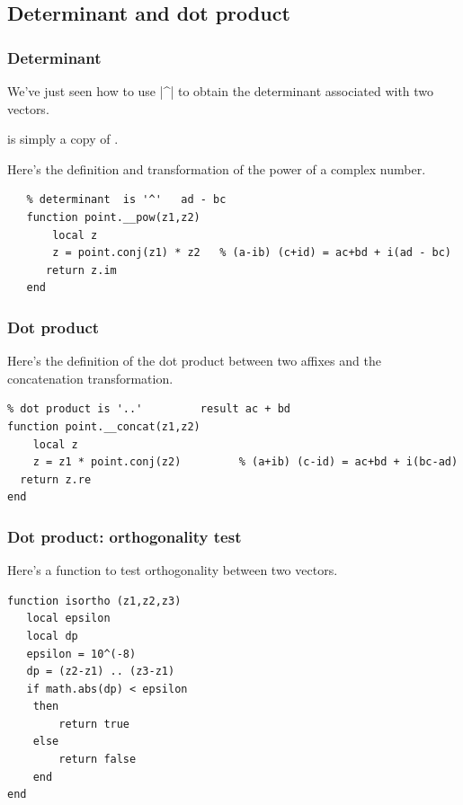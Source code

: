 \subsection{Determinant and dot product} %
\label{sub:determinant_et_produit_scalaire}

\subsubsection{Determinant} %
\label{ssub:determinant}

We've just seen how to use |^| to obtain the determinant associated with two vectors. 

  is simply a copy of   .

Here's the definition and transformation of the power of a complex number.

\begin{Verbatim}
   % determinant  is '^'   ad - bc
   function point.__pow(z1,z2)
       local z
       z = point.conj(z1) * z2   % (a-ib) (c+id) = ac+bd + i(ad - bc)
      return z.im
   end
\end{Verbatim}


\subsubsection{Dot product} %
\label{ssub:scalar_product}

Here's the definition of the dot product between two affixes and the concatenation transformation. 

\begin{Verbatim}
% dot product is '..'         result ac + bd
function point.__concat(z1,z2)
    local z
    z = z1 * point.conj(z2)         % (a+ib) (c-id) = ac+bd + i(bc-ad) 
  return z.re
end
\end{Verbatim}



\subsubsection{Dot product: orthogonality test } %
\label{ssub:scalar_product_orthogonality_test}

Here's a function   to test orthogonality between two vectors.

\begin{Verbatim}
function isortho (z1,z2,z3)
   local epsilon
   local dp
   epsilon = 10^(-8)
   dp = (z2-z1) .. (z3-z1)
   if math.abs(dp) < epsilon 
    then 
        return true
    else 
        return false
    end
end
\end{Verbatim}


